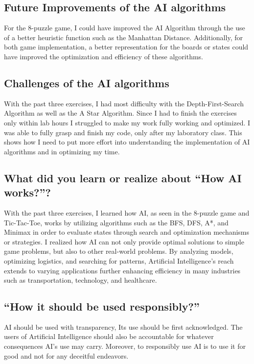 \documentclass[journal]{./IEEE/IEEEtran}
\begin{document}
\subsection{Future Improvements of the AI algorithms}
For the 8-puzzle game, I could have improved the AI Algorithm through the use of a better 
heuristic function such as the Manhattan Distance. Additionally, for both game implementation, 
a better representation for the boards or states could have improved the optimization and 
efficiency of these algorithms.

\subsection{Challenges of the AI algorithms}
With the past three exercises, I had most difficulty with the Depth-First-Search Algorithm as well as the 
A Star Algorithm. Since I had to finish the exercises only within lab hours I struggled to make my work 
fully working and optimized. I was able to fully grasp and finish my code, only after my laboratory class. 
This shows how I need to put more effort into understanding the implementation of AI algorithms and in optimizing my time.

\subsection{What did you learn or realize about “How AI works?”?}
With the past three exercises, I learned how AI, as seen in the 8-puzzle game and Tic-Tac-Toe, works by 
utilizing algorithms such as the BFS, DFS, A*, and Minimax in order to evaluate states through search and 
optimization mechanisms or strategies. I realized how AI can not only provide optimal solutions to simple 
game problems, but also to other real-world problems. By analyzing models, optimizing logistics, and searching for 
patterns, Artificial Intelligence’s reach extends to varying applications further enhancing efficiency in many 
industries such as transportation, technology, and healthcare.

\subsection{“How it should be used responsibly?”}
AI should be used with transparency, Its use should be first acknowledged. The users of 
Artificial Intelligence should also be accountable for whatever consequences AI's use may carry. 
Moreover, to responsibly use AI is to use it for good and not for any deceitful endeavors.
\end{document}
